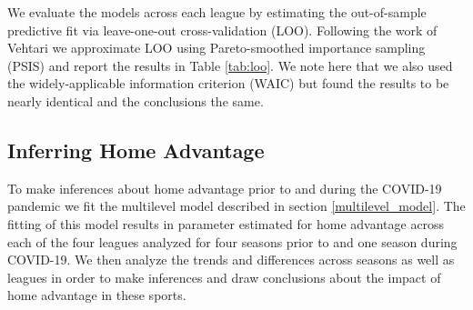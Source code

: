 We evaluate the models across each league by estimating the out-of-sample predictive fit via leave-one-out cross-validation (LOO). Following the work of Vehtari \cite{Vehtari2016} we approximate LOO using Pareto-smoothed importance sampling (PSIS) and report the results in Table \ref{tab:loo}. We note here that we also used the widely-applicable information criterion (WAIC) \cite{Watanabe2010} but found the results to be nearly identical and the conclusions the same.

\subsection{Inferring Home Advantage}
To make inferences about home advantage prior to and during the COVID-19 pandemic we fit the multilevel model described in section \ref{multilevel_model}. The fitting of this model results in parameter estimated for home advantage across each of the four leagues analyzed for four seasons prior to and one season during COVID-19. We then analyze the trends and differences across seasons as well as leagues in order to make inferences and draw conclusions about the impact of home advantage in these sports.